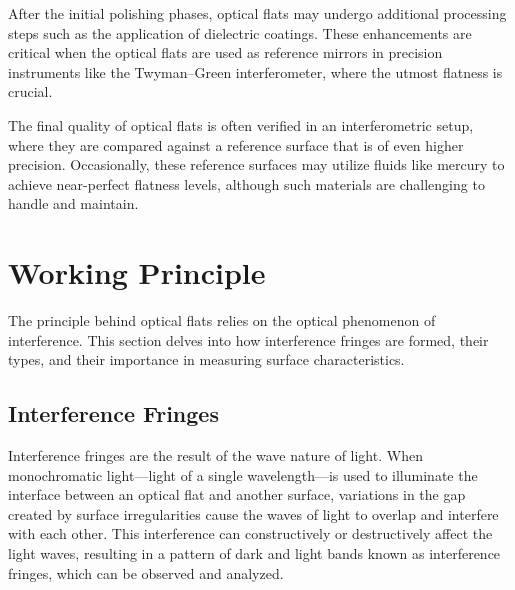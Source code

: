 \documentclass[../main.tex]{subfiles}
\begin{document}
After the initial polishing phases, optical flats may undergo additional processing steps such as the application of dielectric coatings. These enhancements are critical when the optical flats are used as reference mirrors in precision instruments like the Twyman–Green interferometer, where the utmost flatness is crucial.\cite{Paschottaoptical_flats}

The final quality of optical flats is often verified in an interferometric setup, where they are compared against a reference surface that is of even higher precision. Occasionally, these reference surfaces may utilize fluids like mercury to achieve near-perfect flatness levels, although such materials are challenging to handle and maintain.\cite{Paschottaoptical_flats}

\section{Working Principle}
The principle behind optical flats relies on the optical phenomenon of interference. This section delves into how interference fringes are formed, their types, and their importance in measuring surface characteristics.

\subsection{Interference Fringes}
Interference fringes are the result of the wave nature of light. When monochromatic light—light of a single wavelength—is used to illuminate the interface between an optical flat and another surface, variations in the gap created by surface irregularities cause the waves of light to overlap and interfere with each other. This interference can constructively or destructively affect the light waves, resulting in a pattern of dark and light bands known as interference fringes, which can be observed and analyzed.
\end{document}
